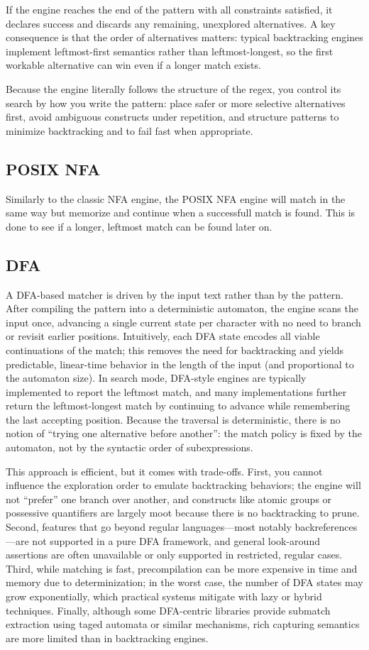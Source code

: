 If the engine reaches the end of the pattern with all constraints satisfied, it declares success and discards any remaining, unexplored alternatives. A key consequence is that the order of alternatives matters: typical backtracking engines implement leftmost-first semantics rather than leftmost-longest, so the first workable alternative can win even if a longer match exists.

Because the engine literally follows the structure of the regex, you control its search by how you write the pattern: place safer or more selective alternatives first, avoid ambiguous constructs under repetition, and structure patterns to minimize backtracking and to fail fast when appropriate.

\subsection{POSIX NFA}
Similarly to the classic NFA engine, the POSIX NFA engine will match in the same way but memorize and continue when a successfull match is found. This is done to see if a longer, leftmost match can be found later on.

\subsection{DFA}
A DFA-based matcher is driven by the input text rather than by the pattern. After compiling the pattern into a deterministic automaton, the engine scans the input once, advancing a single current state per character with no need to branch or revisit earlier positions. Intuitively, each DFA state encodes all viable continuations of the match; this removes the need for backtracking and yields predictable, linear-time behavior in the length of the input (and proportional to the automaton size). In search mode, DFA-style engines are typically implemented to report the leftmost match, and many implementations further return the leftmost-longest match by continuing to advance while remembering the last accepting position. Because the traversal is deterministic, there is no notion of “trying one alternative before another”: the match policy is fixed by the automaton, not by the syntactic order of subexpressions.

This approach is efficient, but it comes with trade-offs. First, you cannot influence the exploration order to emulate backtracking behaviors; the engine will not “prefer” one branch over another, and constructs like atomic groups or possessive quantifiers are largely moot because there is no backtracking to prune. Second, features that go beyond regular languages—most notably backreferences—are not supported in a pure DFA framework, and general look-around assertions are often unavailable or only supported in restricted, regular cases. Third, while matching is fast, precompilation can be more expensive in time and memory due to determinization; in the worst case, the number of DFA states may grow exponentially, which practical systems mitigate with lazy or hybrid techniques. Finally, although some DFA-centric libraries provide submatch extraction using taged automata or similar mechanisms, rich capturing semantics are more limited than in backtracking engines.


